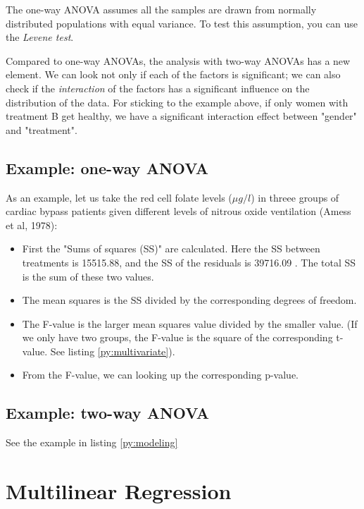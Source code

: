 The one-way ANOVA assumes all the samples are drawn from normally distributed populations with equal variance. To test this assumption, you can use the \emph{Levene test}.

Compared to one-way ANOVAs, the analysis with two-way ANOVAs has a new element. We can look not only if each of the factors is significant; we can also check if the \emph{interaction} of the factors has a significant influence on the distribution of the data. For sticking to the example above, if only women with treatment B get healthy, we have a significant interaction effect between "gender" and "treatment".

\subsection{ Example: one-way ANOVA }
As an example, let us take the red cell folate levels ($\mu g/l$) in threee groups of cardiac bypass patients given different levels of nitrous oxide ventilation (Amess et al, 1978):

\begin{itemize}
  \item First the "Sums of squares (SS)" are calculated. Here the SS between treatments is 15515.88, and the SS of the residuals is 39716.09 . The total SS is the sum of these two values.
  \item The mean squares is the SS divided by the corresponding degrees of freedom.
  \item The F-value is the larger mean squares value divided by the smaller value. (If we only have two groups, the F-value is the square of the corresponding t-value. See listing \ref{py:multivariate}).
  \item From the F-value, we can looking up the corresponding p-value.
\end{itemize}

\subsection{ Example: two-way ANOVA }

See the example in listing \ref{py:modeling}



\section{ Multilinear Regression } 

